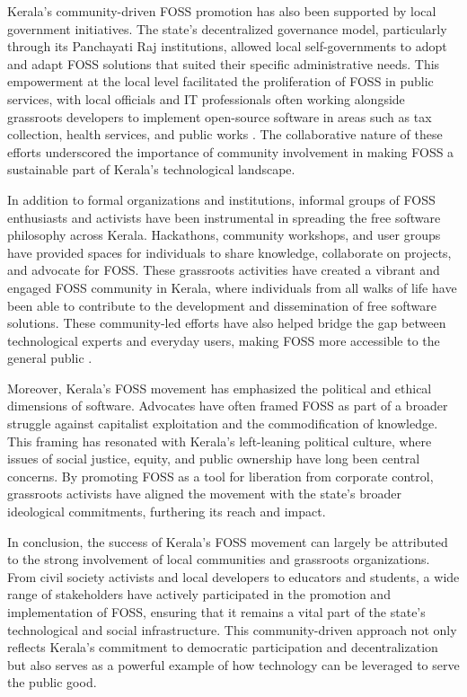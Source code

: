 \begin{refsection}
Kerala’s community-driven FOSS promotion has also been supported by local government initiatives. The state's decentralized governance model, particularly through its Panchayati Raj institutions, allowed local self-governments to adopt and adapt FOSS solutions that suited their specific administrative needs. This empowerment at the local level facilitated the proliferation of FOSS in public services, with local officials and IT professionals often working alongside grassroots developers to implement open-source software in areas such as tax collection, health services, and public works \cite[pp.~45-47]{isaac2000local}. The collaborative nature of these efforts underscored the importance of community involvement in making FOSS a sustainable part of Kerala's technological landscape.

In addition to formal organizations and institutions, informal groups of FOSS enthusiasts and activists have been instrumental in spreading the free software philosophy across Kerala. Hackathons, community workshops, and user groups have provided spaces for individuals to share knowledge, collaborate on projects, and advocate for FOSS. These grassroots activities have created a vibrant and engaged FOSS community in Kerala, where individuals from all walks of life have been able to contribute to the development and dissemination of free software solutions. These community-led efforts have also helped bridge the gap between technological experts and everyday users, making FOSS more accessible to the general public \cite[pp.~23-24]{kurup2020freedom}.

Moreover, Kerala's FOSS movement has emphasized the political and ethical dimensions of software. Advocates have often framed FOSS as part of a broader struggle against capitalist exploitation and the commodification of knowledge. This framing has resonated with Kerala’s left-leaning political culture, where issues of social justice, equity, and public ownership have long been central concerns. By promoting FOSS as a tool for liberation from corporate control, grassroots activists have aligned the movement with the state’s broader ideological commitments, furthering its reach and impact.

In conclusion, the success of Kerala's FOSS movement can largely be attributed to the strong involvement of local communities and grassroots organizations. From civil society activists and local developers to educators and students, a wide range of stakeholders have actively participated in the promotion and implementation of FOSS, ensuring that it remains a vital part of the state’s technological and social infrastructure. This community-driven approach not only reflects Kerala’s commitment to democratic participation and decentralization but also serves as a powerful example of how technology can be leveraged to serve the public good.


\end{refsection}
